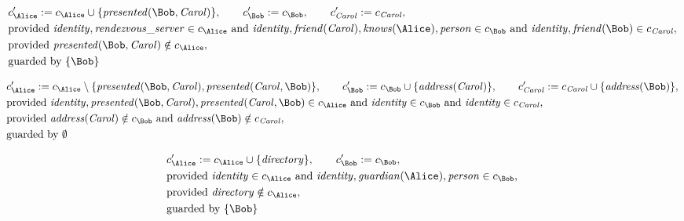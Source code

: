 \begin{align*}
&
c'_
{
\Alice
}
 := 
c_
{
\Alice
}
 \cup 
\{
\mathit{\detokenize{
presented
}}
(
\Bob
,
\mathit{Carol}
)
\}
, \qquad 
c'_
{
\Bob
}
 := 
c_
{
\Bob
}
, \qquad 
c'_
{
\mathit{Carol}
}
 := 
c_
{
\mathit{Carol}
}
,\\
&
\text{provided } 
\mathit{\detokenize{
identity
}}
,
\mathit{\detokenize{
rendezvous_server
}}
 \in c_
{
\Alice
}
 \text{ and } 
\mathit{\detokenize{
identity
}}
,
\mathit{\detokenize{
friend
}}
(
\mathit{Carol}
)
,
\mathit{\detokenize{
knows
}}
(
\Alice
)
,
\mathit{\detokenize{
person
}}
 \in c_
{
\Bob
}
 \text{ and } 
\mathit{\detokenize{
identity
}}
,
\mathit{\detokenize{
friend
}}
(
\Bob
)
 \in c_
{
\mathit{Carol}
}
,\\
&
\text{provided } 
\mathit{\detokenize{
presented
}}
(
\Bob
,
\mathit{Carol}
)
 \notin c_
{
\Alice
}
,\\
&
\text{guarded by } \{
\Bob
\}
\end{align*}

\begin{align*}
&
c'_
{
\Alice
}
 := 
c_
{
\Alice
}
 \setminus 
\{
\mathit{\detokenize{
presented
}}
(
\Bob
,
\mathit{Carol}
)
,
\mathit{\detokenize{
presented
}}
(
\mathit{Carol}
,
\Bob
)
\}
, \qquad 
c'_
{
\Bob
}
 := 
c_
{
\Bob
}
 \cup 
\{
\mathit{\detokenize{
address
}}
(
\mathit{Carol}
)
\}
, \qquad 
c'_
{
\mathit{Carol}
}
 := 
c_
{
\mathit{Carol}
}
 \cup 
\{
\mathit{\detokenize{
address
}}
(
\Bob
)
\}
,\\
&
\text{provided } 
\mathit{\detokenize{
identity
}}
,
\mathit{\detokenize{
presented
}}
(
\Bob
,
\mathit{Carol}
)
,
\mathit{\detokenize{
presented
}}
(
\mathit{Carol}
,
\Bob
)
 \in c_
{
\Alice
}
 \text{ and } 
\mathit{\detokenize{
identity
}}
 \in c_
{
\Bob
}
 \text{ and } 
\mathit{\detokenize{
identity
}}
 \in c_
{
\mathit{Carol}
}
,\\
&
\text{provided } 
\mathit{\detokenize{
address
}}
(
\mathit{Carol}
)
 \notin c_
{
\Bob
}
 \text{ and } 
\mathit{\detokenize{
address
}}
(
\Bob
)
 \notin c_
{
\mathit{Carol}
}
,\\
&
\text{guarded by } \emptyset
\end{align*}

\begin{align*}
&
c'_
{
\Alice
}
 := 
c_
{
\Alice
}
 \cup 
\{
\mathit{\detokenize{
directory
}}
\}
, \qquad 
c'_
{
\Bob
}
 := 
c_
{
\Bob
}
,\\
&
\text{provided } 
\mathit{\detokenize{
identity
}}
 \in c_
{
\Alice
}
 \text{ and } 
\mathit{\detokenize{
identity
}}
,
\mathit{\detokenize{
guardian
}}
(
\Alice
)
,
\mathit{\detokenize{
person
}}
 \in c_
{
\Bob
}
,\\
&
\text{provided } 
\mathit{\detokenize{
directory
}}
 \notin c_
{
\Alice
}
,\\
&
\text{guarded by } \{
\Bob
\}
\end{align*}

